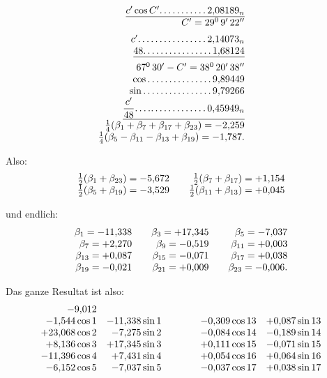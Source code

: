 \begin{landscape}
\[\begin{array}{@{}r@{\qquad}r@{\qquad}r@{}}
\begin{array}[t]{@{}r@{}}
\underline{c'\cos C'\VfourDots{10}2{,}08189_n}\\
C'=29^0\,9'\,22''\\[5pt]
c'\VfourDots{15}2{,}14073_n\\
\underline{48\VfourDots{15}1{,}68124}\\[5pt]
67^0\,30'-C'=38^0\,20'\,38''\\
\cos\VfourDots{14}9{,}89449\\
\sin\VfourDots{15}9{,}79266\\
\underline{\dfrac{c'}{48}\VfourDots{2}\mathord{.}\mkern0.5mu\mathord{.}\,\VfourDots{11}0{,}45949_n}\\[5pt]
\tfrac14(\beta_1+\beta_7+\beta_{17}+\beta_{23})=-2{,}259\\
\tfrac14(\beta_5-\beta_{11}-\beta_{13}+\beta_{19})=-1{,}787.
\end{array}
\end{array}
\]
\par\noindent Also:
\[
\begin{array}{@{}r@{\qquad}r@{}}
\tfrac12(\beta_1+\beta_{23})=-5{,}672&\tfrac12(\beta_7+\beta_{17})=+1{,}154\\
\tfrac12(\beta_5+\beta_{19})=-3{,}529&\tfrac12(\beta_{11}+\beta_{13})=+0{,}045
\end{array}
\]
\par\noindent und endlich:
\[
\begin{array}{@{}r@{\qquad}r@{\qquad}r@{}}
\beta_1=-11{,}338&\beta_3=+17{,}345&\beta_5=-7{,}037\\
\beta_7=+2{,}270&\beta_9=-0{,}519&\beta_{11}=+0{,}003\\
\beta_{13}=+0{,}087&\beta_{15}=-0{,}071&\beta_{17}=+0{,}038\\
\beta_{19}=-0{,}021&\beta_{21}=+0{,}009&\beta_{23}=-0{,}006.
\end{array}
\]
\par\noindent Das ganze Resultat ist also:
\[
\begin{array}{@{}r@{\quad}r@{\qquad\qquad}r@{\quad}r@{}}
-9{,}012&&&\\
-1{,}544\cos 1&-11{,}338\sin 1&-0{,}309\cos 13&+0{,}087\sin 13\\
+23{,}068\cos 2&-7{,}275\sin 2&-0{,}084\cos 14&-0{,}189\sin 14\\
+8{,}136\cos 3&+17{,}345\sin 3&+0{,}111\cos 15&-0{,}071\sin 15\\
-11{,}396\cos 4&+7{,}431\sin 4&+0{,}054\cos 16&+0{,}064\sin 16\\
-6{,}152\cos 5&-7{,}037\sin 5&-0{,}037\cos 17&+0{,}038\sin 17\\

\end{array}\]
\end{landscape}
